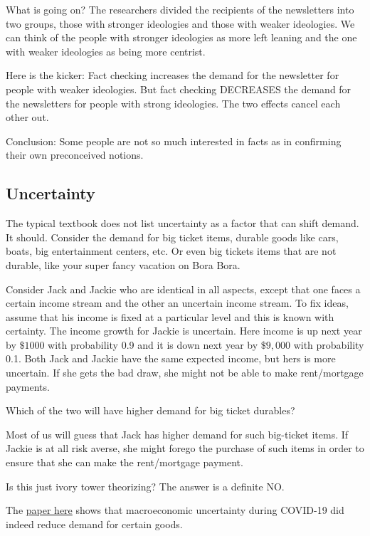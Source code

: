 \documentclass[
]{book}
\begin{document}
What is going on? The researchers divided the recipients of the newsletters into two groups, those with stronger ideologies and those with weaker ideologies. We can think of the people with stronger ideologies as more left leaning and the one with weaker ideologies as being more centrist.

Here is the kicker: Fact checking increases the demand for the newsletter for people with weaker ideologies. But fact checking DECREASES the demand for the newsletters for people with strong ideologies. The two effects cancel each other out.

Conclusion: Some people are not so much interested in facts as in confirming their own preconceived notions.

\hypertarget{uncertainty}{%
\subsection{Uncertainty}\label{uncertainty}}

The typical textbook does not list uncertainty as a factor that can shift demand. It should. Consider the demand for big ticket items, durable goods like cars, boats, big entertainment centers, etc. Or even big tickets items that are not durable, like your super fancy vacation on Bora Bora.

Consider Jack and Jackie who are identical in all aspects, except that one faces a certain income stream and the other an uncertain income stream. To fix ideas, assume that his income is fixed at a particular level and this is known with certainty. The income growth for Jackie is uncertain. Here income is up next year by \(\$1000\) with probability 0.9 and it is down next year by \(\$9,000\) with probability 0.1. Both Jack and Jackie have the same expected income, but hers is more uncertain. If she gets the bad draw, she might not be able to make rent/mortgage payments.

Which of the two will have higher demand for big ticket durables?

Most of us will guess that Jack has higher demand for such big-ticket items. If Jackie is at all risk averse, she might forego the purchase of such items in order to ensure that she can make the rent/mortgage payment.

Is this just ivory tower theorizing? The answer is a definite NO.

The \href{https://www.nber.org/papers/w28625}{paper here} shows that macroeconomic uncertainty during COVID-19 did indeed reduce demand for certain goods.
\end{document}
